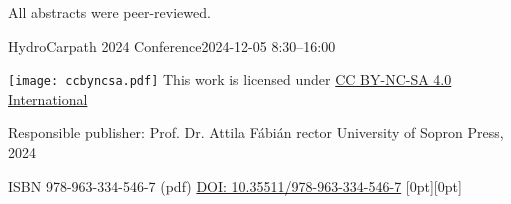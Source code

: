 \vspace*{\fill}
\noindent{}All abstracts were peer-reviewed.
\vspace*{10mm}

\footnotesize{}
\noindent{}HydroCarpath 2024 Conference\newline{}2024-12-05 8:30–16:00
\vspace*{5mm}

\noindent{}\texttt{[image: ccbyncsa.pdf]}\newline{}
This work is licensed under \href{https://creativecommons.org/licenses/by-nc-nd/4.0/deed.en}{CC BY-NC-SA 4.0 International}

\noindent{}Responsible publisher: Prof. Dr. Attila Fábián rector \newline{} University of Sopron Press, 2024

\noindent ISBN 978-963-334-546-7 (pdf)\newline{}
\noindent \href{https://doi.org/10.35511/978-963-334-546-7}{DOI: 10.35511/978-963-334-546-7}
\hspace*{\fill} \hspace{1mm} \raisebox{0mm}[0pt][0pt]{}
\normalsize{}

\setcounter{page}{2}
\cleardoublepage{}
\fancyhead[LE,RO]{\thepage}

\setcounter{secnumdepth}{0}%
{}
\tableofcontents{}
\newpage{}
{}


{}

\setcounter{articleid}{0}
{}


{}
\printindex
{}
{}


